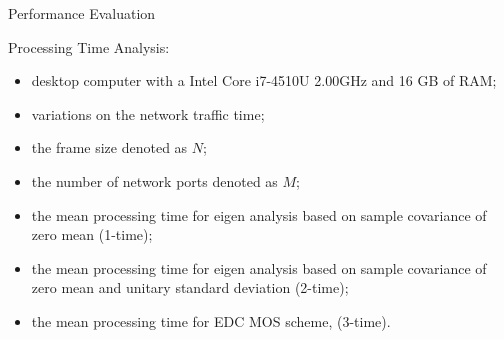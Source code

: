 \documentclass[newPxFont, numfooter, sectionpages]{beamer}
\begin{document}
\begin{frame}{Performance Evaluation}
	
	Processing Time Analysis:
	\begin{itemize}
		\item desktop computer with a Intel Core i7-4510U 2.00GHz and 16 GB of RAM;
		\item variations on the network traffic time; 
		\item the frame size denoted as $N$; 
		\item the number of network ports denoted as $M$; 
		\item the mean processing time for eigen analysis based on sample covariance of zero mean (1-time); 
		\item the mean processing time for eigen analysis based on sample covariance of zero mean and unitary standard deviation (2-time); 
		\item the mean processing time for EDC MOS scheme, (3-time).
	\end{itemize}
	
\end{frame}
\end{document}
